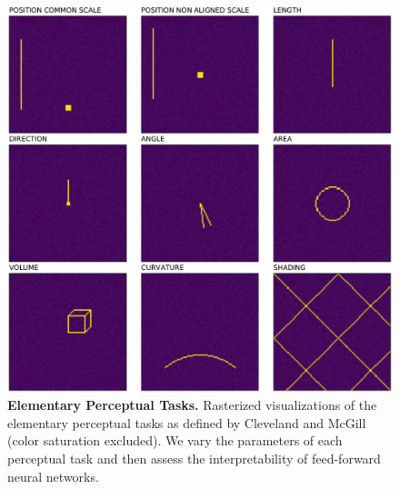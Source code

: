 \documentclass[journal]{vgtc}                %
\begin{document}
\begin{figure}[t]
	  \includegraphics[width=\linewidth]{figure1_overview.pdf}
  \caption{\textbf{Elementary Perceptual Tasks.} Rasterized visualizations of the elementary perceptual tasks as defined by Cleveland and McGill~\cite{cleveland_mcgill} (color saturation excluded). We vary the parameters of each perceptual task and then assess the interpretability of feed-forward neural networks.}
	\label{fig:elementary_perceptual_tasks}
\end{figure}
\end{document}
